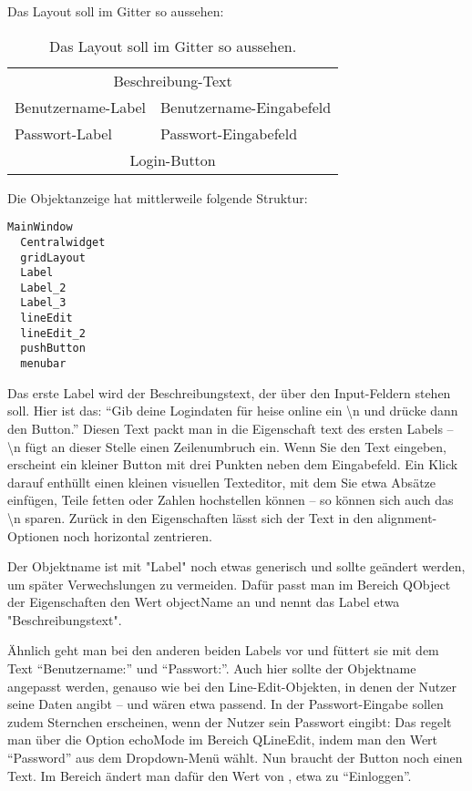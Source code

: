 Das Layout soll im Gitter so aussehen:

\begin{table}
  \begin{tabular}{ll}
    \multicolumn{2}{c}{Beschreibung-Text} \\
    Benutzername-Label &	Benutzername-Eingabefeld\\
    Passwort-Label &	Passwort-Eingabefeld \\
    \multicolumn{2}{c}{Login-Button} \\
  \end{tabular}    
  \caption{Das Layout soll im Gitter so aussehen.}
\end{table}

Die Objektanzeige hat mittlerweile folgende Struktur:

\begin{lstlisting}
MainWindow
  Centralwidget
  gridLayout
  Label
  Label_2
  Label_3
  lineEdit
  lineEdit_2
  pushButton
  menubar
\end{lstlisting}

Das erste Label wird der Beschreibungstext, der über den Input-Feldern stehen soll. Hier ist das: ``Gib deine Logindaten für heise online ein \textbackslash n und drücke dann den Button.'' Diesen Text packt man in die Eigenschaft text des ersten Labels -- \textbackslash n fügt an dieser Stelle einen Zeilenumbruch ein. Wenn Sie den Text eingeben, erscheint ein kleiner Button mit drei Punkten neben dem Eingabefeld. Ein Klick darauf enthüllt einen kleinen visuellen Texteditor, mit dem Sie etwa Absätze einfügen, Teile fetten oder Zahlen hochstellen können -- so können sich auch das \textbackslash n sparen. Zurück in den Eigenschaften lässt sich der Text in den alignment-Optionen noch horizontal zentrieren.

Der Objektname ist mit "Label" noch etwas generisch und sollte geändert werden, um später Verwechslungen zu vermeiden. Dafür passt man im Bereich QObject der Eigenschaften den Wert objectName an und nennt das Label etwa "Beschreibungstext".

Ähnlich geht man bei den anderen beiden Labels vor und füttert sie mit dem Text ``Benutzername:'' und ``Passwort:''. Auch hier sollte der Objektname angepasst werden, genauso wie bei den Line-Edit-Objekten, in denen der Nutzer seine Daten angibt --  und  wären etwa passend. In der Passwort-Eingabe sollen zudem Sternchen erscheinen, wenn der Nutzer sein Passwort eingibt: Das regelt man über die Option echoMode im Bereich QLineEdit, indem man den Wert ``Password'' aus dem Dropdown-Menü wählt. Nun braucht der Button noch einen Text. Im Bereich  ändert man dafür den Wert von , etwa zu ``Einloggen''.

